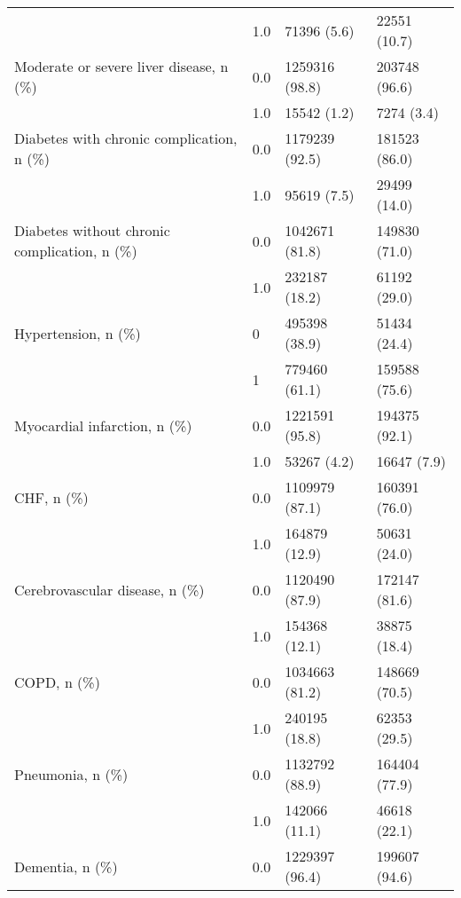 \begin{tabular}{llll}
                                       & 1.0 &                    71396 (5.6) &       22551 (10.7) \\
Moderate or severe liver disease, n (\%) & 0.0 &                 1259316 (98.8) &      203748 (96.6) \\
                                       & 1.0 &                    15542 (1.2) &         7274 (3.4) \\
Diabetes with chronic complication, n (\%) & 0.0 &                 1179239 (92.5) &      181523 (86.0) \\
                                       & 1.0 &                    95619 (7.5) &       29499 (14.0) \\
Diabetes without chronic complication, n (\%) & 0.0 &                 1042671 (81.8) &      149830 (71.0) \\
                                       & 1.0 &                  232187 (18.2) &       61192 (29.0) \\
Hypertension, n (\%) & 0 &                  495398 (38.9) &       51434 (24.4) \\
                                       & 1 &                  779460 (61.1) &      159588 (75.6) \\
Myocardial infarction, n (\%) & 0.0 &                 1221591 (95.8) &      194375 (92.1) \\
                                       & 1.0 &                    53267 (4.2) &        16647 (7.9) \\
CHF, n (\%) & 0.0 &                 1109979 (87.1) &      160391 (76.0) \\
                                       & 1.0 &                  164879 (12.9) &       50631 (24.0) \\
Cerebrovascular disease, n (\%) & 0.0 &                 1120490 (87.9) &      172147 (81.6) \\
                                       & 1.0 &                  154368 (12.1) &       38875 (18.4) \\
COPD, n (\%) & 0.0 &                 1034663 (81.2) &      148669 (70.5) \\
                                       & 1.0 &                  240195 (18.8) &       62353 (29.5) \\
Pneumonia, n (\%) & 0.0 &                 1132792 (88.9) &      164404 (77.9) \\
                                       & 1.0 &                  142066 (11.1) &       46618 (22.1) \\
Dementia, n (\%) & 0.0 &                 1229397 (96.4) &      199607 (94.6) \\

\end{tabular}
